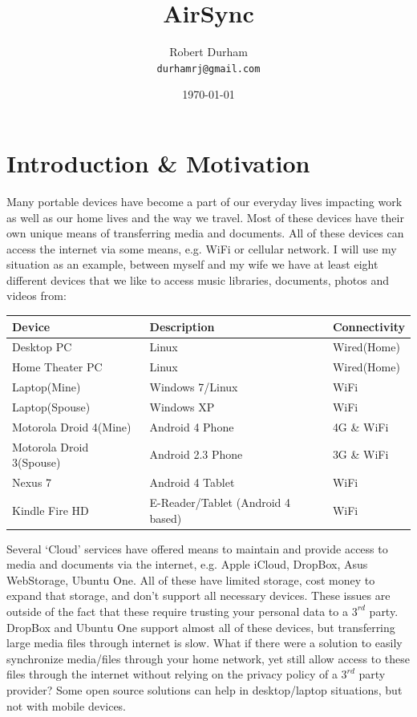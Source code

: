 \documentclass[12pt]{article}
\begin{document}
\title {AirSync}
\author {Robert Durham\\
	\texttt{durhamrj@gmail.com}}
\date {\today}
\maketitle

\section{Introduction \& Motivation}
Many portable devices have become a part of our everyday lives impacting work as well as our home lives and the way we travel. Most of these devices have their own unique means of transferring media and documents. All of these devices can access the internet via some means, e.g. WiFi or cellular network. I will use my situation as an example, between myself and my wife we have at least eight different devices that we like to access music libraries, documents, photos and videos from:

\footnotesize
\begin{center}
\begin{tabular}{|l|l|l|}
\hline
	\textbf{Device} & \textbf{Description} & \textbf{Connectivity}\\
\hline
	Desktop PC & Linux & Wired(Home)\\
\hline 
	Home Theater PC & Linux & Wired(Home)\\
\hline
	Laptop(Mine) & Windows 7/Linux & WiFi\\
\hline
	Laptop(Spouse) & Windows XP & WiFi\\
\hline
	Motorola Droid 4(Mine) & Android 4 Phone & 4G \& WiFi\\
\hline
	Motorola Droid 3(Spouse) & Android 2.3 Phone & 3G \& WiFi\\
\hline
	Nexus 7 & Android 4 Tablet & WiFi\\
\hline
	Kindle Fire HD & E-Reader/Tablet (Android 4 based) & WiFi\\
\hline
\end{tabular}
\end{center}
\normalsize
Several `Cloud' services have offered means to maintain and provide access to media and documents via the internet, e.g. Apple iCloud, DropBox, Asus WebStorage, Ubuntu One. All of these have limited storage, cost money to expand that storage, and don't support all necessary devices. These issues are outside of the fact that these require trusting your personal data to a $3^{rd}$ party. DropBox and Ubuntu One support almost all of these devices, but transferring large media files through internet is slow. What if there were a solution to easily synchronize media/files through your home network, yet still allow access to these files through the internet without relying on the privacy policy of a $3^{rd}$ party provider? Some open source solutions can help in desktop/laptop situations, but not with mobile devices.
\end{document}

